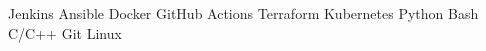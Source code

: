 
\begin{cvskillstriple}
  {\8} {Jenkins}
  {\6} {Ansible}
  {\8} {Docker}
\cvskilltriple {}
  {\8} {GitHub Actions}
  {\2} {Terraform}
  {\4} {Kubernetes}
  {\7} {Python}
  {\8} {Bash}
  {\6} {C/C++}
  {\9} {Git}
  {\9} {Linux}
  {} {}
\end{cvskillstriple}




